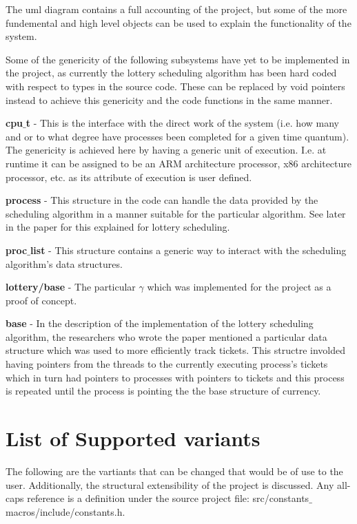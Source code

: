 \documentclass[acmsmall]{acmart}
\newcommand{\csfont}[1]{\fontfamily{cmtt}\selectfont #1}
\begin{document}
\begin{multicols}{2}
    The uml diagram contains a full accounting of the project, but some of the
    more fundemental and high level objects can be used to explain the
    functionality of the system.
    \par
    Some of the  genericity of the following subsystems have yet to be
    implemented in the project, as currently the lottery scheduling algorithm
    has been hard coded with respect to types in the source code.  These can be replaced by void
    pointers instead to achieve this genericity and the code functions in the
    same manner.
    \par
    \textbf{cpu$\_$t} - This is the interface with the direct work of the system
    (i.e. how many and or to what degree have processes been completed for a
    given time quantum). The genericity is achieved here by having a generic
    unit of execution. I.e. at runtime it can be assigned to be an ARM
    architecture processor, x86 architecture processor, etc. as its attribute of
    execution is user defined.
    \par
    \textbf{process} - This structure in the code can handle the data provided
    by the scheduling algorithm in a manner suitable for the particular
    algorithm. See later in the paper for this explained for lottery scheduling.
    \par
    \textbf{proc$\_$list} - This structure contains a generic way to
    interact with the scheduling algorithm's data structures.
    \par
    \textbf{lottery/base} - The particular $\gamma$ which was implemented for
    the project as a proof of concept.
    \par
    \textbf{base} - In the description of the implementation of the lottery
    scheduling algorithm, the researchers who wrote the paper mentioned a
    particular data structure which was used to more efficiently track tickets.
    This structre involded having pointers from the threads to the currently
    executing process's tickets which in turn had pointers to processes with
    pointers to tickets and this process is repeated until the process is
    pointing the the base structure of currency.
    \par

\section{List of Supported variants}
  The following are the vartiants that can be changed that would be of use to
  the user. Additionally, the structural extensibility of the project is
  discussed. Any all-caps reference is a definition under the source project
  file: {\csfont{src/constants$\_$macros/include/constants.h}}.

\end{multicols}
\end{document}
